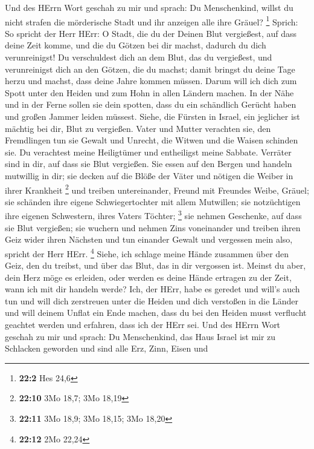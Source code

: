  Und des HErrn Wort geschah zu mir und sprach:
 Du Menschenkind, willst du nicht strafen die mörderische
Stadt und ihr anzeigen alle ihre Gräuel? \footnote{\textbf{22:2} Hes
  24,6}  Sprich: So spricht der Herr HErr: O Stadt, die du
der Deinen Blut vergießest, auf dass deine Zeit komme, und die du Götzen
bei dir machst, dadurch du dich verunreinigst!  Du
verschuldest dich an dem Blut, das du vergießest, und verunreinigst dich
an den Götzen, die du machst; damit bringst du deine Tage herzu und
machst, dass deine Jahre kommen müssen. Darum will ich dich zum Spott
unter den Heiden und zum Hohn in allen Ländern machen.  In
der Nähe und in der Ferne sollen sie dein spotten, dass du ein
schändlich Gerücht haben und großen Jammer leiden müssest.
 Siehe, die Fürsten in Israel, ein jeglicher ist mächtig
bei dir, Blut zu vergießen.  Vater und Mutter verachten
sie, den Fremdlingen tun sie Gewalt und Unrecht, die Witwen und die
Waisen schinden sie.  Du verachtest meine Heiligtümer und
entheiligst meine Sabbate.  Verräter sind in dir, auf dass
sie Blut vergießen. Sie essen auf den Bergen und handeln mutwillig in
dir;  sie decken auf die Blöße der Väter und nötigen die
Weiber in ihrer Krankheit \footnote{\textbf{22:10} 3Mo 18,7; 3Mo 18,19}
 und treiben untereinander, Freund mit Freundes Weibe,
Gräuel; sie schänden ihre eigene Schwiegertochter mit allem Mutwillen;
sie notzüchtigen ihre eigenen Schwestern, ihres Vaters Töchter;
\footnote{\textbf{22:11} 3Mo 18,9; 3Mo 18,15; 3Mo 18,20} 
sie nehmen Geschenke, auf dass sie Blut vergießen; sie wuchern und
nehmen Zins voneinander und treiben ihren Geiz wider ihren Nächsten und
tun einander Gewalt und vergessen mein also, spricht der Herr HErr.
\footnote{\textbf{22:12} 2Mo 22,24}  Siehe, ich schlage
meine Hände zusammen über den Geiz, den du treibst, und über das Blut,
das in dir vergossen ist.  Meinst du aber, dein Herz möge
es erleiden, oder werden es deine Hände ertragen zu der Zeit, wann ich
mit dir handeln werde? Ich, der HErr, habe es geredet und will's auch
tun  und will dich zerstreuen unter die Heiden und dich
verstoßen in die Länder und will deinem Unflat ein Ende machen,
 dass du bei den Heiden musst verflucht geachtet werden
und erfahren, dass ich der HErr sei.  Und des HErrn Wort
geschah zu mir und sprach:  Du Menschenkind, das Haus
Israel ist mir zu Schlacken geworden und sind alle Erz, Zinn, Eisen und
